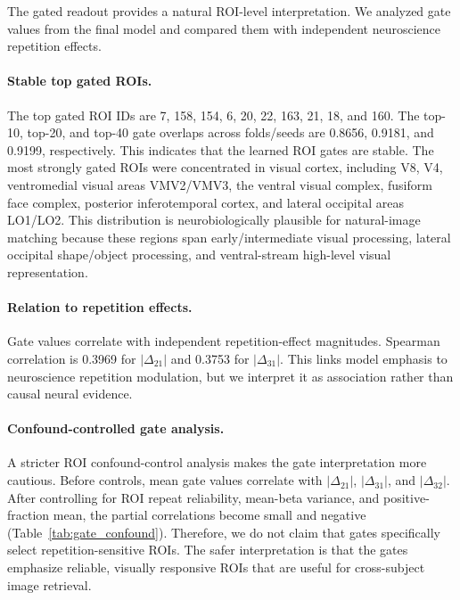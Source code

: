 \documentclass{article}
\begin{document}
The gated readout provides a natural ROI-level interpretation. We analyzed gate values from the final model and compared them with independent neuroscience repetition effects.

\paragraph{Stable top gated ROIs.}
The top gated ROI IDs are 7, 158, 154, 6, 20, 22, 163, 21, 18, and 160. The top-10, top-20, and top-40 gate overlaps across folds/seeds are 0.8656, 0.9181, and 0.9199, respectively. This indicates that the learned ROI gates are stable. The most strongly gated ROIs were concentrated in visual cortex, including V8, V4, ventromedial visual areas VMV2/VMV3, the ventral visual complex, fusiform face complex, posterior inferotemporal cortex, and lateral occipital areas LO1/LO2. This distribution is neurobiologically plausible for natural-image matching because these regions span early/intermediate visual processing, lateral occipital shape/object processing, and ventral-stream high-level visual representation.

\paragraph{Relation to repetition effects.}
Gate values correlate with independent repetition-effect magnitudes. Spearman correlation is 0.3969 for $|\Delta_{21}|$ and 0.3753 for $|\Delta_{31}|$. This links model emphasis to neuroscience repetition modulation, but we interpret it as association rather than causal neural evidence.

\paragraph{Confound-controlled gate analysis.}
A stricter ROI confound-control analysis makes the gate interpretation more cautious. Before controls, mean gate values correlate with $|\Delta_{21}|$, $|\Delta_{31}|$, and $|\Delta_{32}|$. After controlling for ROI repeat reliability, mean-beta variance, and positive-fraction mean, the partial correlations become small and negative (Table~\ref{tab:gate_confound}). Therefore, we do not claim that gates specifically select repetition-sensitive ROIs. The safer interpretation is that the gates emphasize reliable, visually responsive ROIs that are useful for cross-subject image retrieval.
\end{document}
